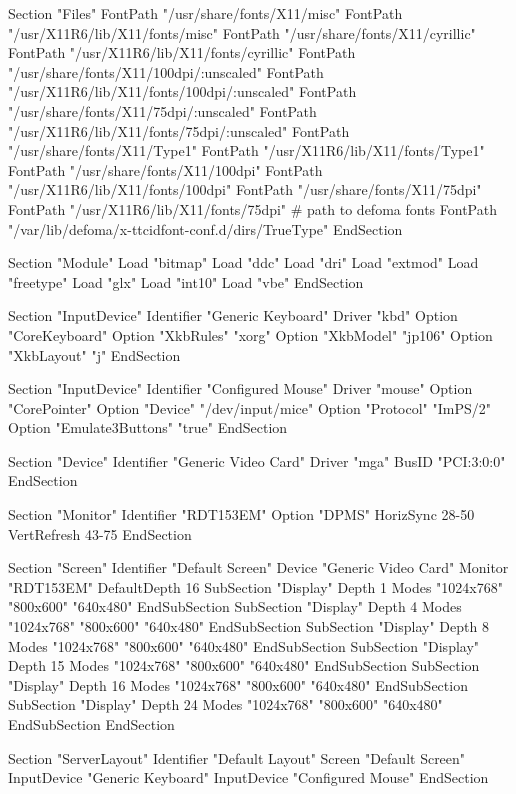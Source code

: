 \documentclass[mingoth,a4paper]{jsarticle}
\begin{document}
{{{{{{{{{{{\begin{commandline}
Section "Files"
	FontPath	"/usr/share/fonts/X11/misc"
	FontPath	"/usr/X11R6/lib/X11/fonts/misc"
	FontPath	"/usr/share/fonts/X11/cyrillic"
	FontPath	"/usr/X11R6/lib/X11/fonts/cyrillic"
	FontPath	"/usr/share/fonts/X11/100dpi/:unscaled"
	FontPath	"/usr/X11R6/lib/X11/fonts/100dpi/:unscaled"
	FontPath	"/usr/share/fonts/X11/75dpi/:unscaled"
	FontPath	"/usr/X11R6/lib/X11/fonts/75dpi/:unscaled"
	FontPath	"/usr/share/fonts/X11/Type1"
	FontPath	"/usr/X11R6/lib/X11/fonts/Type1"
	FontPath	"/usr/share/fonts/X11/100dpi"
	FontPath	"/usr/X11R6/lib/X11/fonts/100dpi"
	FontPath	"/usr/share/fonts/X11/75dpi"
	FontPath	"/usr/X11R6/lib/X11/fonts/75dpi"
	# path to defoma fonts
	FontPath	"/var/lib/defoma/x-ttcidfont-conf.d/dirs/TrueType"
EndSection

Section "Module"
	Load	"bitmap"
	Load	"ddc"
	Load	"dri"
	Load	"extmod"
	Load	"freetype"
	Load	"glx"
	Load	"int10"
	Load	"vbe"
EndSection

Section "InputDevice"
	Identifier	"Generic Keyboard"
	Driver		"kbd"
	Option		"CoreKeyboard"
	Option		"XkbRules"	"xorg"
	Option		"XkbModel"	"jp106"
	Option		"XkbLayout"	"j"
EndSection

Section "InputDevice"
	Identifier	"Configured Mouse"
	Driver		"mouse"
	Option		"CorePointer"
	Option		"Device"		"/dev/input/mice"
	Option		"Protocol"		"ImPS/2"
	Option		"Emulate3Buttons"	"true"
EndSection

Section "Device"
	Identifier	"Generic Video Card"
	Driver		"mga"
	BusID		"PCI:3:0:0"
EndSection

Section "Monitor"
	Identifier	"RDT153EM"
	Option		"DPMS"
	HorizSync	28-50
	VertRefresh	43-75
EndSection

\end{commandline}
\begin{commandline}
Section "Screen"
	Identifier	"Default Screen"
	Device		"Generic Video Card"
	Monitor		"RDT153EM"
	DefaultDepth	16
	SubSection "Display"
		Depth		1
		Modes		"1024x768" "800x600" "640x480"
	EndSubSection
	SubSection "Display"
		Depth		4
		Modes		"1024x768" "800x600" "640x480"
	EndSubSection
	SubSection "Display"
		Depth		8
		Modes		"1024x768" "800x600" "640x480"
	EndSubSection
	SubSection "Display"
		Depth		15
		Modes		"1024x768" "800x600" "640x480"
	EndSubSection
	SubSection "Display"
		Depth		16
		Modes		"1024x768" "800x600" "640x480"
	EndSubSection
	SubSection "Display"
		Depth		24
		Modes		"1024x768" "800x600" "640x480"
	EndSubSection
EndSection

Section "ServerLayout"
	Identifier	"Default Layout"
	Screen		"Default Screen"
	InputDevice	"Generic Keyboard"
	InputDevice	"Configured Mouse"
EndSection


\end{commandline}}}}}}}}}}}}
\end{document}
